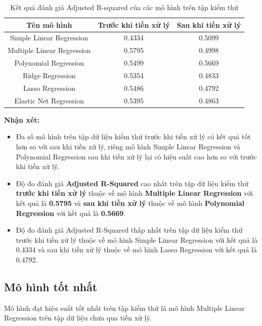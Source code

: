 \documentclass[runningheads]{llncs}
\begin{document}
\begin{table}[H]
	\setlength{\tabcolsep}{0.5em}
	\renewcommand{\arraystretch}{1.2}
	\begin{center}
		\caption{Kết quả đánh giá Adjusted R-squared của các mô hình trên tập kiểm thử}\label{tab3}
		\begin{tabular}{|c|c|c|}
			\hline
			Tên mô hình&Trước khi tiền xử lý&Sau khi tiền xử lý\\
			\hline
			Simple Linear Regression&0.4334&0.5099\\
			\hline
			Multiple Linear Regression&0.5795&0.4998\\
			\hline
			Polynomial Regression&0.5499&0.5669\\
			\hline
			Ridge Regression&0.5354&0.4833\\
			\hline
			Lasso Regression&0.5486&0.4792\\
			\hline
			Elastic Net Regression&0.5395&0.4863\\
			\hline
		\end{tabular}			
	\end{center}
\end{table}

\textbf{Nhận xét:}
\begin{itemize}
	\item Đa số mô hình trên tập dữ liệu kiểm thử trước khi tiền xử lý có kết quả tốt hơn so với sau khi tiền xử lý, riêng mô hình Simple Linear Regression và Polynomial Regression sau khi tiền xử lý lại có hiệu suất cao hơn so với trước khi tiền xử lý.
	\item Độ đo đánh giá \textbf{Adjusted R-Squared} cao nhất trên tập dữ liệu kiểm thử \textbf{trước khi tiền xử lý} thuộc về mô hình \textbf{Multiple Linear Regression} với kết quả là \textbf{0.5795} và \textbf{sau khi tiền xử lý} thuộc về mô hình \textbf{Polynomial Regression} với kết quả là \textbf{0.5669}.
	\item Độ đo đánh giá Adjusted R-Squared thấp nhất trên tập dữ liệu kiểm thử trước khi tiền xử lý thuộc về mô hình Simple Linear Regression với kết quả là 0.4334 và sau khi tiền xử lý thuộc về mô hình Lasso Regression với kết quả là 0.4792.
\end{itemize}


\subsection{Mô hình tốt nhất}
Mô hình đạt hiệu suất tốt nhất trên tập kiểm thử là mô hình Multiple Linear Regression trên tập dữ liệu chưa qua tiền xử lý.
\end{document}
